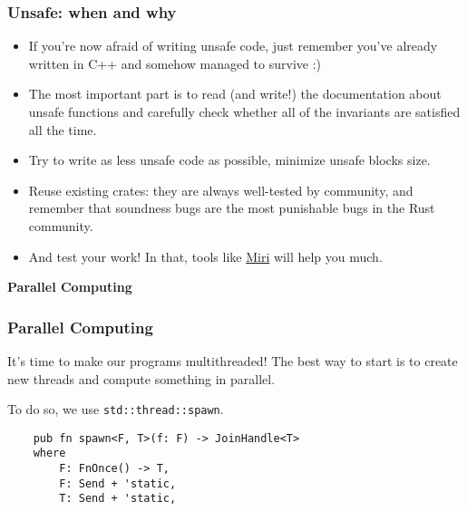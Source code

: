 \documentclass[aspectratio=1610,t]{beamer}
\begin{document}
\begin{frame}[fragile]
\frametitle{Unsafe: when and why}
\begin{itemize}
    \item<1-> If you're now afraid of writing unsafe code, just remember you've already written in C++ and somehow managed to survive :)
    \item<2-> The most important part is to read (and write!) the documentation about unsafe functions and carefully check whether all of the invariants are satisfied all the time.
    \item<3-> Try to write as less unsafe code as possible, minimize unsafe blocks size.
    \item<4-> Reuse existing crates: they are always well-tested by community, and remember that soundness bugs are the most punishable bugs in the Rust community.
    \item<5-> And test your work! In that, tools like \href{https://github.com/rust-lang/miri}{Miri} will help you much.
\end{itemize}
\end{frame}


\begin{frame}[c]
\centering\Huge\textbf{Parallel Computing}\let\thefootnote\relax{}
\end{frame}


\begin{frame}[fragile]
\frametitle{Parallel Computing}
It's time to make our programs multithreaded! The best way to start is to create new threads and compute something in parallel.

To do so, we use \texttt{std::thread::spawn}.

\begin{verbatim}
    pub fn spawn<F, T>(f: F) -> JoinHandle<T> 
    where
        F: FnOnce() -> T,
        F: Send + 'static,
        T: Send + 'static,
\end{verbatim}
\end{frame}

\end{document}
